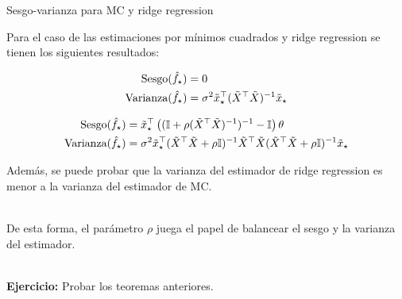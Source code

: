 \documentclass[handout, 9pt]{beamer}
\begin{document}
\begin{frame}{Sesgo-varianza para MC y ridge regression}

Para el caso de las estimaciones por mínimos cuadrados y ridge regression se tienen los siguientes resultados:

\begin{teorema}
	\begin{align*}
	\text{Sesgo}(\hat f_\star) &= 0\\
	\text{Varianza}(\hat f_\star) &= \sigma^2 \tilde{x}_\star^\top (\tilde{X}^\top\tilde{X})^{-1}	\tilde{x}_\star
\end{align*}
\end{teorema}\pause
	
\begin{teorema}
	\begin{align*}
	\text{Sesgo}(\hat f_\star) & = \tilde{x}_\star^\top \left(({\mathbb I}+\rho(\tilde{X}^\top\tilde{X})^{-1})^{-1}-{\mathbb I}\right)\theta\\
	\text{Varianza}(\hat f_\star) &= \sigma^2 \tilde{x}_\star^\top (\tilde{X}^\top\tilde{X} + \rho{\mathbb I})^{-1}\tilde{X}^\top\tilde{X}(\tilde{X}^\top\tilde{X}+\rho{\mathbb I})^{-1}	\tilde{x}_\star
\end{align*}

\end{teorema}	\pause
Además, se puede probar que la varianza del estimador de ridge regression es menor a la varianza del estimador de MC.	\\~\ \pause

De esta forma, el parámetro $\rho$ juega el papel de balancear el sesgo y la varianza del estimador.\\~\ 

\textbf{Ejercicio:} Probar los teoremas anteriores. 
	
\end{frame}
\end{document}
